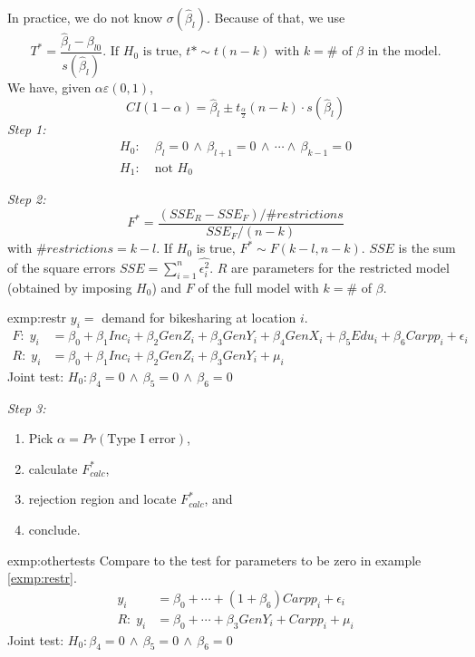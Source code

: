 		In practice, we do not know $\sigma(\hat{\beta}_l)$. Because of that, we use
		\begin{equation*}
			T^*=\frac{\hat{\beta}_l-\beta_{l0}}{s(\hat{\beta}_l)}\text{. If $H_0$ is true, } t*\sim t(n-k)\text{ with } k=\#\text{ of }\beta\text{ in the model.}
		\end{equation*}
			We have, given $\alpha\varepsilon(0,1)$,
			\begin{equation*}
				CI(1-\alpha)=\hat{\beta}_l\pm t_{\frac{\alpha}{2}}(n-k)\cdot s(\hat{\beta}_l)
			\end{equation*}
			\emph{Step 1:}
			\begin{align*}
				H_0:\; &\beta_l=0\,\wedge\,\beta_{l+1}=0\,\wedge\,\cdots\wedge\,\beta_{k-1}=0\\
				H_1:\; &\text{not }H_0
			\end{align*}
			
			\emph{Step 2:}
			\begin{equation*}
				F^*=\frac{(SSE_R-SSE_F)/\#restrictions}{SSE_F/(n-k)}
			\end{equation*}
			with $\#restrictions=k-l$.
			If $H_0$ is true, $F^*\sim F(k-l,n-k)$.
			$SSE$ is the sum of the square errors $SSE=\sum\limits_{i=1}^n\hat{\epsilon_i^2}$.
			$R$ are parameters for the restricted model (obtained by imposing $H_0$) and $F$ of the full model with $k= \#$ of $\beta$.
			
			\begin{exmp}{exmp:restr}
				$y_i=$ demand for bikesharing at location $i$.
				\begin{align*}
					F:\; y_i&=\beta_0+\beta_1 Inc_i +\beta_2 GenZ_i+\beta_3 GenY_i+\beta_4 GenX_i+\beta_5 Edu_i+\beta_6 Carpp_i +\epsilon_i\\
					R:\; y_i&=\beta_0+\beta_1 Inc_i +\beta_2 GenZ_i+\beta_3 GenY_i +\mu_i						
				\end{align*}
				Joint test: $H_0: \beta_4=0\,\wedge\,\beta_5=0\,\wedge\,\beta_6=0$					
			\end{exmp}
			
			\emph{Step 3:}
				\begin{enumerate}[	a.]
					\item Pick $\alpha=Pr(\text{Type I error})$,
					\item calculate $F^*_{calc}$,
					\item rejection region and locate $F^*_{calc}$, and
					\item conclude.
				\end{enumerate}
				\begin{exmp}{exmp:othertests}
					Compare to the test for parameters to be zero in example \ref{exmp:restr}.
					\begin{align*}
						y_i&=\beta_0+\cdots+(1+\beta_6)Carpp_i+\epsilon_i\\
						R:\; y_i&=\beta_0+\cdots+\beta_3 GenY_i+Carpp_i+\mu_i
					\end{align*}
					Joint test: $H_0: \beta_4=0\,\wedge\,\beta_5=0\,\wedge\,\beta_6=0$
				\end{exmp}				
